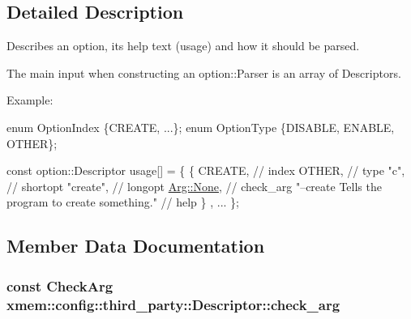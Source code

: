\subsection{Detailed Description}
Describes an option, its help text (usage) and how it should be parsed. 

The main input when constructing an option\-::\-Parser is an array of Descriptors.

\begin{DoxyParagraph}{Example\-:}

\begin{DoxyCode}
\textcolor{keyword}{enum} OptionIndex \{CREATE, ...\};
\textcolor{keyword}{enum} OptionType \{DISABLE, ENABLE, OTHER\};

\textcolor{keyword}{const} option::Descriptor usage[] = \{
  \{ CREATE,                                            \textcolor{comment}{// index}
    OTHER,                                             \textcolor{comment}{// type}
    \textcolor{stringliteral}{"c"},                                               \textcolor{comment}{// shortopt}
    \textcolor{stringliteral}{"create"},                                          \textcolor{comment}{// longopt}
    \hyperlink{structxmem_1_1config_1_1third__party_1_1_arg_afdfd4a0adea72c759ec04bf5feaf3ec0}{Arg::None},                                         \textcolor{comment}{// check\_arg}
    \textcolor{stringliteral}{"--create  Tells the program to create something."} \textcolor{comment}{// help}
  \}
  , ...
\};
\end{DoxyCode}
 
\end{DoxyParagraph}


\subsection{Member Data Documentation}
\hypertarget{structxmem_1_1config_1_1third__party_1_1_descriptor_a65b39f8d61de820bb5001d590e7dea5d}{
\subsubsection[{check\-\_\-arg}]{\setlength{\rightskip}{0pt plus 5cm}const Check\-Arg xmem\-::config\-::third\-\_\-party\-::\-Descriptor\-::check\-\_\-arg}}\label{structxmem_1_1config_1_1third__party_1_1_descriptor_a65b39f8d61de820bb5001d590e7dea5d}


